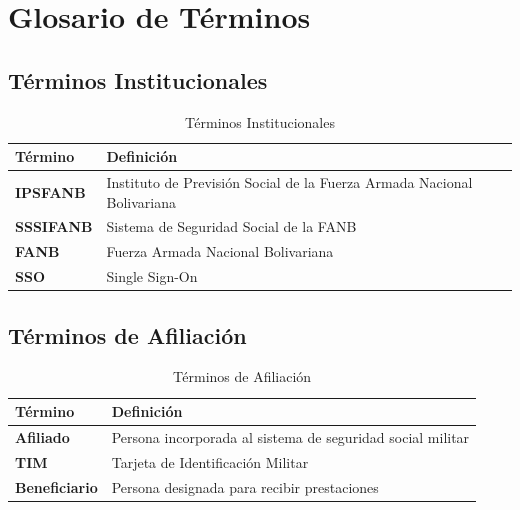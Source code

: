 
\chapter*{Glosario de Términos}

\section*{Términos Institucionales}

\begin{longtable}{p{3cm}p{9cm}}
\toprule
\textbf{Término} & \textbf{Definición} \\
\midrule
\endhead
\bottomrule
\caption{Términos Institucionales}
\label{tab:glosario-institucional}
\endlastfoot

\textbf{IPSFANB} & Instituto de Previsión Social de la Fuerza Armada Nacional Bolivariana \\[0.3cm]
\textbf{SSSIFANB} & Sistema de Seguridad Social de la FANB \\[0.3cm]
\textbf{FANB} & Fuerza Armada Nacional Bolivariana \\[0.3cm]
\textbf{SSO} & Single Sign-On \\
\end{longtable}

\section*{Términos de Afiliación}

\begin{longtable}{p{3cm}p{9cm}}
\toprule
\textbf{Término} & \textbf{Definición} \\
\midrule
\endhead
\bottomrule
\caption{Términos de Afiliación}
\label{tab:glosario-afiliacion}
\endlastfoot

\textbf{Afiliado} & Persona incorporada al sistema de seguridad social militar \\[0.3cm]
\textbf{TIM} & Tarjeta de Identificación Militar \\[0.3cm]
\textbf{Beneficiario} & Persona designada para recibir prestaciones \\
\end{longtable}

